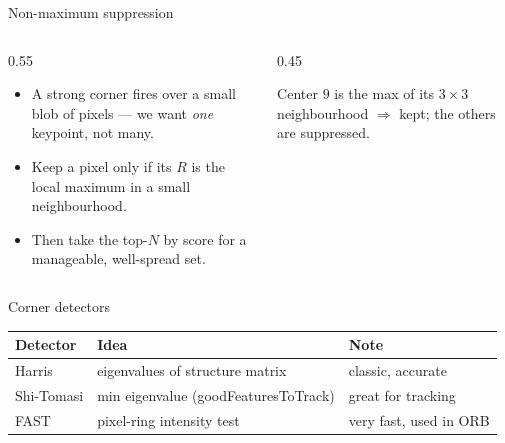 \documentclass[10pt,aspectratio=169]{beamer}
\begin{document}
\begin{frame}{Non-maximum suppression}
  \begin{columns}[T]
    \begin{column}{0.55\textwidth}
      \begin{itemize}
        \item A strong corner fires over a small blob of pixels — we want \emph{one} keypoint, not many.
        \item Keep a pixel only if its $R$ is the local maximum in a small neighbourhood.
        \item Then take the top-$N$ by score for a manageable, well-spread set.
      \end{itemize}
    \end{column}
    \begin{column}{0.45\textwidth}
      \begin{center}
      \end{center}
      {\scriptsize Center $9$ is the max of its $3{\times}3$ neighbourhood $\Rightarrow$ kept; the others are suppressed.}
    \end{column}
  \end{columns}
\end{frame}

\begin{frame}{Corner detectors}
  \begin{center}
  \begin{tabular}{@{}lll@{}}
    \toprule
    \textbf{Detector} & \textbf{Idea} & \textbf{Note} \\
    \midrule
    Harris & eigenvalues of structure matrix & classic, accurate \\
    Shi-Tomasi & min eigenvalue (goodFeaturesToTrack) & great for tracking \\
    FAST & pixel-ring intensity test & very fast, used in ORB \\
    \bottomrule
  \end{tabular}
  \end{center}
\end{frame}
\end{document}
